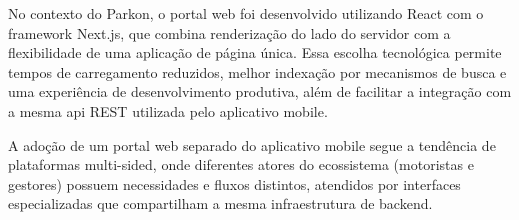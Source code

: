 No contexto do Parkon, o portal web foi desenvolvido utilizando React com o framework Next.js, que combina renderização do lado do servidor com a flexibilidade de uma aplicação de página única. Essa escolha tecnológica permite tempos de carregamento reduzidos, melhor indexação por mecanismos de busca e uma experiência de desenvolvimento produtiva, além de facilitar a integração com a mesma \acrshort{api} REST utilizada pelo aplicativo mobile.

A adoção de um portal web separado do aplicativo mobile segue a tendência de plataformas multi-sided, onde diferentes atores do ecossistema (motoristas e gestores) possuem necessidades e fluxos distintos, atendidos por interfaces especializadas que compartilham a mesma infraestrutura de backend.
